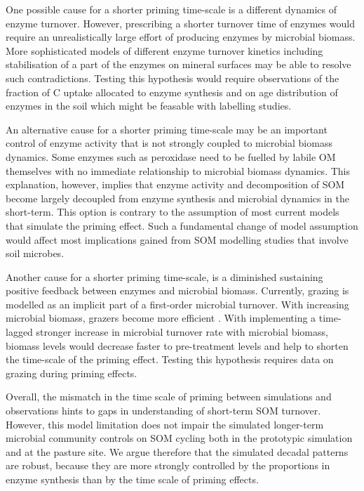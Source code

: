 One possible cause for a shorter priming time-scale is a different dynamics of
enzyme turnover. However, prescribing a shorter turnover time of enzymes would
require an unrealistically large effort of producing enzymes by microbial
biomass. More sophisticated models of different enzyme turnover kinetics
including stabilisation of a part of the enzymes on mineral surfaces
\citep{Burns13} may be able to resolve such contradictions. Testing this
hypothesis would require observations of the fraction of C uptake allocated to
enzyme synthesis and on age distribution of enzymes in the soil which might be
feasable with labelling studies.

An alternative cause for a shorter priming time-scale may be an important
control of enzyme activity that is not strongly coupled to microbial biomass
dynamics. Some enzymes such as peroxidase need to be fuelled by labile OM
themselves \citep{Rousk14} with no immediate relationship to microbial biomass
dynamics. This explanation, however, implies that enzyme activity and
decomposition of SOM become largely decoupled from enzyme synthesis and
microbial dynamics in the short-term. This option is contrary to the assumption
of most current models that simulate the priming effect. Such a fundamental
change of model assumption would affect most implications gained from
SOM modelling studies that involve soil microbes.

Another cause for a shorter priming time-scale, is a diminished sustaining
positive feedback between enzymes and microbial biomass. Currently, grazing is
modelled as an implicit part of a first-order microbial turnover. With
increasing microbial biomass, grazers become more efficient \citep{Clarholm81}.
With implementing a time-lagged stronger increase in microbial turnover rate
with microbial biomass, biomass levels would decrease faster to pre-treatment
levels and help to shorten the time-scale of the priming effect. Testing this
hypothesis requires data on grazing during priming effects.

Overall, the mismatch in the time scale of priming between simulations and
observations hints to gaps in understanding of short-term SOM turnover. 
However, this model limitation does not impair the
simulated longer-term microbial community controls on SOM cycling both in the
prototypic simulation and at the pasture site. We argue therefore that the
simulated decadal patterns are robust, because they are more strongly
controlled by the proportions in enzyme synthesis than by the time scale of
priming effects. 

